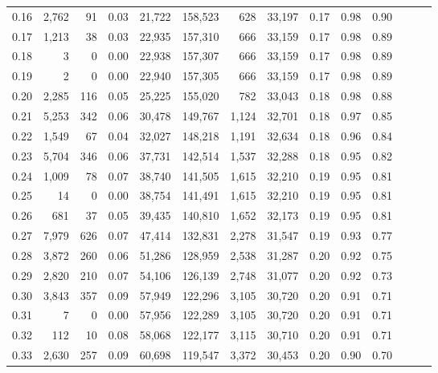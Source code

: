 \begin{tabular}{rrrrrrrrrrrrrr}
0.16 &   2,762 &     91 &  0.03 &   21,722 &  158,523 &     628 &  33,197 &  0.17 &  0.98 &      0.90 \\
0.17 &   1,213 &     38 &  0.03 &   22,935 &  157,310 &     666 &  33,159 &  0.17 &  0.98 &      0.89 \\
0.18 &       3 &      0 &  0.00 &   22,938 &  157,307 &     666 &  33,159 &  0.17 &  0.98 &      0.89 \\
0.19 &       2 &      0 &  0.00 &   22,940 &  157,305 &     666 &  33,159 &  0.17 &  0.98 &      0.89 \\
0.20 &   2,285 &    116 &  0.05 &   25,225 &  155,020 &     782 &  33,043 &  0.18 &  0.98 &      0.88 \\
0.21 &   5,253 &    342 &  0.06 &   30,478 &  149,767 &   1,124 &  32,701 &  0.18 &  0.97 &      0.85 \\
0.22 &   1,549 &     67 &  0.04 &   32,027 &  148,218 &   1,191 &  32,634 &  0.18 &  0.96 &      0.84 \\
0.23 &   5,704 &    346 &  0.06 &   37,731 &  142,514 &   1,537 &  32,288 &  0.18 &  0.95 &      0.82 \\
0.24 &   1,009 &     78 &  0.07 &   38,740 &  141,505 &   1,615 &  32,210 &  0.19 &  0.95 &      0.81 \\
0.25 &      14 &      0 &  0.00 &   38,754 &  141,491 &   1,615 &  32,210 &  0.19 &  0.95 &      0.81 \\
0.26 &     681 &     37 &  0.05 &   39,435 &  140,810 &   1,652 &  32,173 &  0.19 &  0.95 &      0.81 \\
0.27 &   7,979 &    626 &  0.07 &   47,414 &  132,831 &   2,278 &  31,547 &  0.19 &  0.93 &      0.77 \\
0.28 &   3,872 &    260 &  0.06 &   51,286 &  128,959 &   2,538 &  31,287 &  0.20 &  0.92 &      0.75 \\
0.29 &   2,820 &    210 &  0.07 &   54,106 &  126,139 &   2,748 &  31,077 &  0.20 &  0.92 &      0.73 \\
0.30 &   3,843 &    357 &  0.09 &   57,949 &  122,296 &   3,105 &  30,720 &  0.20 &  0.91 &      0.71 \\
0.31 &       7 &      0 &  0.00 &   57,956 &  122,289 &   3,105 &  30,720 &  0.20 &  0.91 &      0.71 \\
0.32 &     112 &     10 &  0.08 &   58,068 &  122,177 &   3,115 &  30,710 &  0.20 &  0.91 &      0.71 \\
0.33 &   2,630 &    257 &  0.09 &   60,698 &  119,547 &   3,372 &  30,453 &  0.20 &  0.90 &      0.70 \\

\end{tabular}
